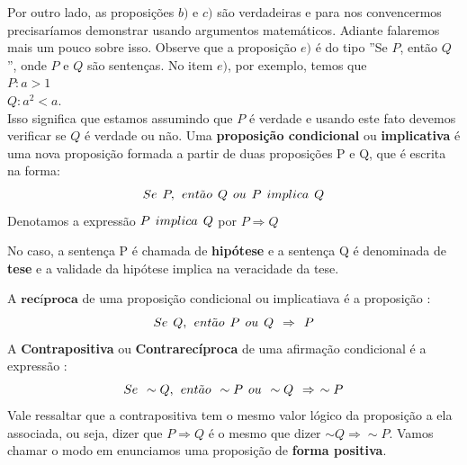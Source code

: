 Por outro lado, as proposições $b)$ e $c)$ são verdadeiras e para nos convencermos precisaríamos demonstrar usando argumentos matemáticos. Adiante falaremos mais um pouco sobre isso. Observe que a proposição $e)$ é do tipo ''Se $P$, então $Q$'', onde $P$ e $Q$ são sentenças. No item $e)$, por exemplo, temos que \\
$P: a>1$ \\
$Q: a^2<a$. \\
Isso significa que estamos assumindo que $P$ é verdade e usando este fato devemos verificar se $Q$ é verdade ou não.
Uma \textbf{proposição condicional} ou \textbf{implicativa} é uma nova proposição formada a partir de duas proposições P e Q, que é escrita na forma:
$$ Se \hspace{0,15cm}P, \hspace{0,15cm} ent\tilde{a}o  \hspace{0,15cm}Q \hspace{0,15cm} ou \hspace{0,15cm} P \hspace{0,15cm} implica \hspace{0,15cm} Q$$
Denotamos a expressão $P \hspace{0,15cm} implica \hspace{0,15cm} Q$ por $P \Rightarrow Q $

No caso, a sentença P é chamada de \textbf{hipótese}
e a sentença Q é denominada de \textbf{tese} e a validade da hipótese  implica na veracidade da tese.

A $\textbf{recíproca}$ de uma proposição condicional ou implicatiava é a proposição :
$$ Se \hspace{0,15cm}Q, \hspace{0,15cm} ent\tilde{a}o   \hspace{0,15cm}P \hspace{0,15cm} ou \hspace{0,15cm} Q \hspace{0,15cm} \Rightarrow \hspace{0,15cm} P$$
A \textbf{Contrapositiva} ou \textbf{Contrarecíproca} de uma afirmação condicional é a expressão :
$$ Se \hspace{0,15cm} \sim Q, \hspace{0,15cm} ent\tilde{a}o  \hspace{0,15cm} \sim P \hspace{0,15cm} ou \hspace{0,15cm}  \sim Q \hspace{0,15cm} \Rightarrow \hspace{0,15cm} \sim P$$
Vale ressaltar que a contrapositiva tem o mesmo valor lógico da proposição a ela associada, ou seja, dizer que $P \Rightarrow Q$ é o mesmo que dizer $\sim Q \Rightarrow \sim P$.
Vamos chamar o modo em enunciamos uma proposição de \textbf{forma  positiva}.


